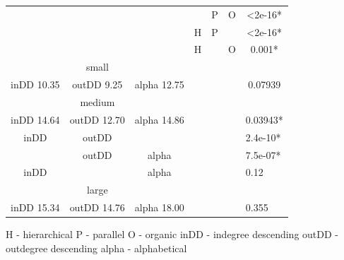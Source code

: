 \documentclass{l4proj}
\begin{document}
\begin{table}[H]
\begin{tabular}{|c|c|c|c|c|c|c|}
\multicolumn{3}{|c|}{\cellcolor{gray}}                    & \cellcolor{gray} & P    & O           & \textless2e-16*               \\ \cline{4-7} 
\multicolumn{3}{|c|}{\cellcolor{gray}}                    & H           & P	&\cellcolor{gray}    & \textless2e-16*               \\ \cline{4-7} 
\multicolumn{3}{|c|}{\cellcolor{gray}}                    & H           & \cellcolor{gray} & O    & 0.001*                        \\ \hline
\multicolumn{3}{|c|}{small}               & \multicolumn{3}{c|}{\multirow{9}{*}{\cellcolor{gray}}}  &                              \cellcolor{gray} \\ \cline{1-3} \cline{7-7} 
inDD 10.35   & outDD 9.25   & alpha 12.75 & \multicolumn{3}{c|}{\cellcolor{gray}}                   & 0.07939                       \\ \cline{1-3} \cline{7-7} 
\multicolumn{3}{|c|}{medium}              & \multicolumn{3}{c|}{\cellcolor{gray}}                   &                              \cellcolor{gray} \\ \cline{1-3} \cline{7-7} 
inDD 14.64   & outDD 12.70  & alpha 14.86 & \multicolumn{3}{c|}{\cellcolor{gray}}                   & \multicolumn{1}{l|}{0.03943*} \\ \cline{1-3} \cline{7-7} 
inDD         & {outDD} &\cellcolor{gray} & \multicolumn{3}{c|}{\cellcolor{gray}}                   & \multicolumn{1}{l|}{2.4e-10*} \\ \cline{1-3} \cline{7-7} 
\cellcolor{gray}& outDD & alpha       & \multicolumn{3}{c|}{\cellcolor{gray}}                   & \multicolumn{1}{l|}{7.5e-07*} \\ \cline{1-3} \cline{7-7} 
inDD &\cellcolor{gray} &  alpha       & \multicolumn{3}{c|}{\cellcolor{gray}}                   & \multicolumn{1}{l|}{0.12}     \\ \cline{1-3} \cline{7-7} 
\multicolumn{3}{|c|}{large}               & \multicolumn{3}{c|}{\cellcolor{gray}}                   & \multicolumn{1}{l|}{\cellcolor{gray}}         \\ \cline{1-3} \cline{7-7} 
inDD 15.34   & outDD 14.76  & alpha 18.00 & \multicolumn{3}{c|}{\cellcolor{gray}}                   & \multicolumn{1}{l|}{0.355}    \\ \hline
\end{tabular}
\end{table}

H - hierarchical P - parallel O - organic inDD - indegree descending outDD - outdegree descending alpha - alphabetical
\end{document}
